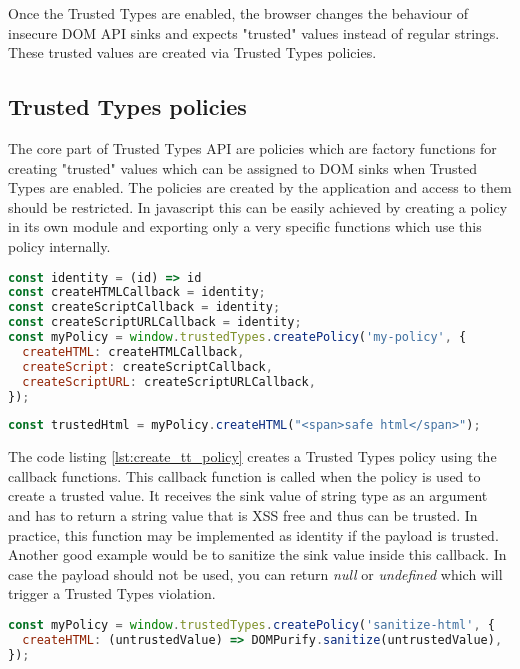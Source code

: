 Once the Trusted Types are enabled, the browser changes the behaviour of insecure DOM API sinks and
expects "trusted" values instead of regular strings. These trusted values are created via Trusted
Types policies.

\subsection{Trusted Types policies}
\label{subsec:tt_policy}

The core part of Trusted Types API are policies which are factory functions for creating "trusted"
values which can be assigned to DOM sinks when Trusted Types are enabled. The policies are created
by the application and access to them should be restricted. In javascript this can be easily
achieved by creating a policy in its own module and exporting only a very specific functions which
use this policy internally.

\bigskip
\begin{lstlisting}[language=JavaScript, caption=Creating Trusted Types policy, label={lst:create_tt_policy}]
const identity = (id) => id
const createHTMLCallback = identity;
const createScriptCallback = identity;
const createScriptURLCallback = identity;
const myPolicy = window.trustedTypes.createPolicy('my-policy', {
  createHTML: createHTMLCallback,
  createScript: createScriptCallback,
  createScriptURL: createScriptURLCallback,
});
\end{lstlisting}

\bigskip
\begin{lstlisting}[language=JavaScript, caption=Create trusted value using a policy]
const trustedHtml = myPolicy.createHTML("<span>safe html</span>");
\end{lstlisting}

The code listing \ref{lst:create_tt_policy} creates a Trusted Types policy using the callback
functions. This callback function is called when the policy is used to create a trusted value. It
receives the sink value of string type as an argument and has to return a string value that is XSS
free and thus can be trusted. In practice, this function may be implemented as identity if the
payload is trusted. Another good example would be to sanitize the sink value inside this callback.
In case the payload should not be used, you can return \textit{null} or \textit{undefined} which
will trigger a Trusted Types violation.

\bigskip
\begin{lstlisting}[language=JavaScript, caption=Using a policy to sanitize HTML values]
const myPolicy = window.trustedTypes.createPolicy('sanitize-html', {
  createHTML: (untrustedValue) => DOMPurify.sanitize(untrustedValue),
});
\end{lstlisting}

